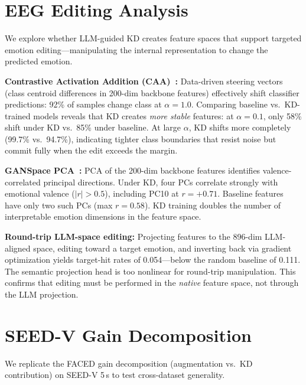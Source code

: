 \section{EEG Editing Analysis}
\label{sec:supp_editing}

We explore whether LLM-guided KD creates feature spaces that support targeted emotion editing---manipulating the internal representation to change the predicted emotion.

\noindent\textbf{Contrastive Activation Addition (CAA)~\cite{rimsky2024steering}:} Data-driven steering vectors (class centroid differences in 200-dim backbone features) effectively shift classifier predictions: 92\% of samples change class at $\alpha = 1.0$. Comparing baseline vs.\ KD-trained models reveals that KD creates \emph{more stable} features: at $\alpha = 0.1$, only 58\% shift under KD vs.\ 85\% under baseline. At large $\alpha$, KD shifts more completely (99.7\% vs.\ 94.7\%), indicating tighter class boundaries that resist noise but commit fully when the edit exceeds the margin.

\noindent\textbf{GANSpace PCA~\cite{harkonnen2020ganspace}:} PCA of the 200-dim backbone features identifies valence-correlated principal directions. Under KD, four PCs correlate strongly with emotional valence ($|r| > 0.5$), including PC10 at $r = +0.71$. Baseline features have only two such PCs (max $r = 0.58$). KD training doubles the number of interpretable emotion dimensions in the feature space.

\noindent\textbf{Round-trip LLM-space editing:} Projecting features to the 896-dim LLM-aligned space, editing toward a target emotion, and inverting back via gradient optimization yields target-hit rates of 0.054---below the random baseline of 0.111. The semantic projection head is too nonlinear for round-trip manipulation. This confirms that editing must be performed in the \emph{native} feature space, not through the LLM projection.

\section{SEED-V Gain Decomposition}
\label{sec:supp_seedv_decomp}

We replicate the FACED gain decomposition (augmentation vs.\ KD contribution) on SEED-V 5\,s to test cross-dataset generality.

